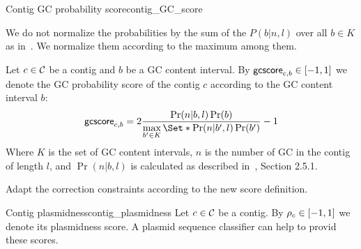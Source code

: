\begin{definition}{Contig GC probability score}{contig_GC_score}
  \begin{newfeatbox}
    We do not normalize the probabilities by the sum of the \(P(b|n,l)\) over all \(b \in K\) as in~\cite{manePlasBinflowFlowbasedMILP2023}. We normalize them according to the maximum among them.
  \end{newfeatbox}
  Let \(c \in \mathcal{C}{}\) be a contig and \(b\) be a GC content interval.
  By \(\mathsf{gcscore}_{c, b} \in [-1, 1]\) we denote the GC probability score of the contig \(c\) according to the GC content interval \(b\):
  \[
    \gcscore{c}{b} = 2 \frac{\Pr(n|b,l)\Pr(b)}{\max\limits_{b' \in K}\Set*{\Pr(n|b',l)\Pr(b')}} - 1
  \]
  Where \(K\) is the set of GC content intervals, \(n\) is the number of GC in the contig of length \(l\), and \(\Pr(n|b,l)\) is calculated as described in~\cite{manePlasBinflowFlowbasedMILP2023}, Section 2.5.1.

  \begin{fixmebox}
    Adapt the correction constraints according to the new score definition.
  \end{fixmebox}
\end{definition}

\begin{definition}{Contig plasmidness}{contig_plasmidness}
  Let \(c \in \mathcal{C}{}\) be a contig.
  By \(\rho_{c} \in [-1, 1]\) we denote its plasmidness score.
  A plasmid sequence classifier can help to provid these scores.
\end{definition}